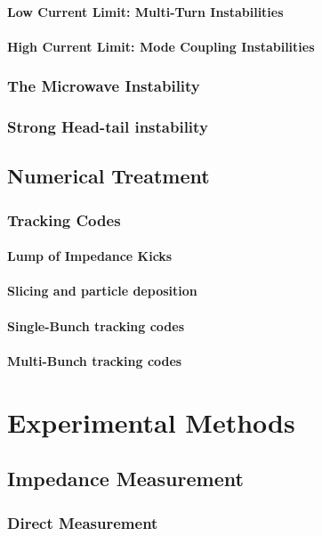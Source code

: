\subsubsection{Low Current Limit: Multi-Turn Instabilities}
\subsubsection{High Current Limit: Mode Coupling Instabilities}
\subsection{The Microwave Instability}
\subsection{Strong Head-tail instability}
\section{Numerical Treatment}
\subsection{Tracking Codes}
\subsubsection{Lump of Impedance Kicks}
\subsubsection{Slicing and particle deposition}
\subsubsection{Single-Bunch tracking codes}
\subsubsection{Multi-Bunch tracking codes}


\chapter{Experimental Methods}
\section{Impedance Measurement}
\subsection{Direct Measurement}
